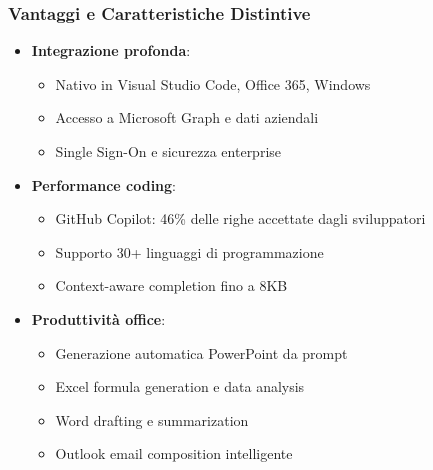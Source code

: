 \documentclass[aspectratio=169]{beamer}
\begin{document}
\begin{frame}
\frametitle{Vantaggi e Caratteristiche Distintive}
\begin{itemize}
    \item \textbf{Integrazione profonda}:
    \begin{itemize}
        \item Nativo in Visual Studio Code, Office 365, Windows
        \item Accesso a Microsoft Graph e dati aziendali
        \item Single Sign-On e sicurezza enterprise
    \end{itemize}
    \item \textbf{Performance coding}:
    \begin{itemize}
        \item GitHub Copilot: 46\% delle righe accettate dagli sviluppatori
        \item Supporto 30+ linguaggi di programmazione
        \item Context-aware completion fino a 8KB
    \end{itemize}
    \item \textbf{Produttività office}:
    \begin{itemize}
        \item Generazione automatica PowerPoint da prompt
        \item Excel formula generation e data analysis
        \item Word drafting e summarization
        \item Outlook email composition intelligente
    \end{itemize}
\end{itemize}
\end{frame}
%
%
\end{document}
